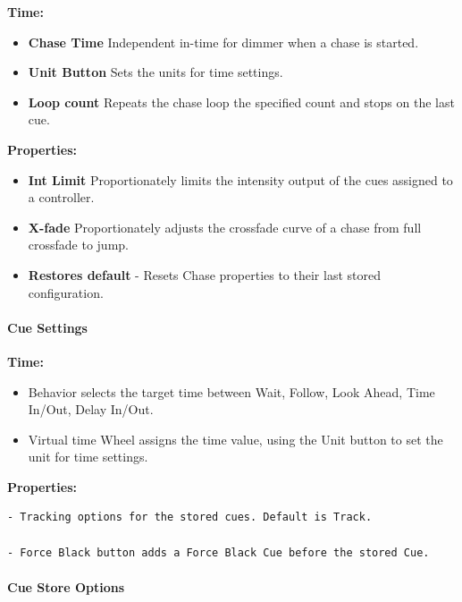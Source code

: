 \documentclass[
]{article}
\begin{document}
\textbf{Time:}

\begin{itemize}
\item
  \textbf{Chase Time} Independent in-time for dimmer when a chase is started.
\item
  \textbf{Unit Button} Sets the units for time settings.
\item
  \textbf{Loop count} Repeats the chase loop the specified count and stops on the last cue.
\end{itemize}

\textbf{Properties:}

\begin{itemize}
\item
  \textbf{Int Limit} Proportionately limits the intensity output of the cues assigned to a controller.
\item
  \textbf{X-fade} Proportionately adjusts the crossfade curve of a chase from full crossfade to jump.
\item
  \textbf{Restores default} - Resets Chase properties to their last stored configuration.
\end{itemize}

\hypertarget{cue-settings}{%
\paragraph{Cue Settings}\label{cue-settings}}

\textbf{Time:}

\begin{itemize}
\item
  Behavior selects the target time between Wait, Follow, Look Ahead, Time In/Out, Delay In/Out.
\item
  Virtual time Wheel assigns the time value, using the Unit button to set the unit for time settings.
\end{itemize}

\textbf{Properties:}

\begin{verbatim}
- Tracking options for the stored cues. Default is Track.

- Force Black button adds a Force Black Cue before the stored Cue.
\end{verbatim}

\hypertarget{cue-store-options}{%
\paragraph{Cue Store Options}\label{cue-store-options}}
\end{document}

